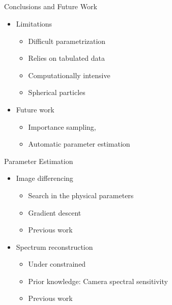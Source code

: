 \documentclass{beamer}
\begin{document}
\subsection{ }
\begin{frame}{Conclusions and Future Work}

\begin{itemize}
\setlength\itemsep{0.5em}
\item Limitations
	\begin{itemize}
	\setlength\itemsep{0.5em}
	\item Difficult parametrization
	\item Relies on tabulated data
	\item Computationally intensive
	\item Spherical particles
	\end{itemize}
\item Future work
	\begin{itemize}
	\setlength\itemsep{0.5em}
	\item Importance sampling,~\cite{Mizutani2014,Wang2014}
	\item Automatic parameter estimation
	\end{itemize}
\end{itemize}

\end{frame}

\begin{frame}{Parameter Estimation}

\begin{itemize}
\setlength\itemsep{0.5em}
\item Image differencing
	\begin{itemize}
	\setlength\itemsep{0.5em}
	\item Search in the physical parameters
	\item Gradient descent
	\item Previous work~\cite{Dobashi:2012}
	\end{itemize}
\item Spectrum reconstruction
	\begin{itemize}
	\setlength\itemsep{0.5em}
	\item Under constrained
	\item Prior knowledge: Camera spectral sensitivity
	\item Previous work~\cite{Smits:1999, Sun2001, Drew:2003}
	\end{itemize}
\end{itemize}

\end{frame}
\end{document}

